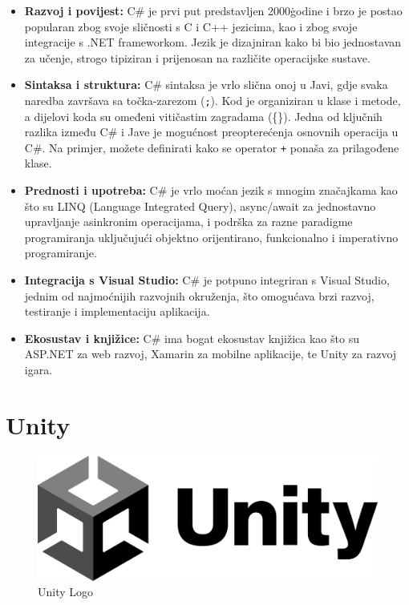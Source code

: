 \documentclass[diplomskirad]{fer}
\begin{document}
    \begin{itemize}
        \item \textbf{Razvoj i povijest:} C\# je prvi put predstavljen 2000\. godine i brzo je postao popularan zbog svoje sličnosti s C i C++ jezicima,
        kao i zbog svoje integracije s .NET frameworkom.
        Jezik je dizajniran kako bi bio jednostavan za učenje, strogo tipiziran i prijenosan na različite operacijske sustave.
        \item \textbf{Sintaksa i struktura:} C\# sintaksa je vrlo slična onoj u Javi, gdje svaka naredba završava sa točka-zarezom (\texttt{;}).
        Kod je organiziran u klase i metode, a dijelovi koda su omeđeni vitičastim zagradama (\{\}).
        Jedna od ključnih razlika između C\# i Jave je mogućnost preopterećenja osnovnih operacija u C\#.
        Na primjer, možete definirati kako se operator \texttt{+} ponaša za prilagođene klase.
        \item \textbf{Prednosti i upotreba:} C\# je vrlo moćan jezik s mnogim značajkama kao što su LINQ (Language Integrated Query),
        async/await za jednostavno upravljanje asinkronim operacijama, i podrška za razne paradigme programiranja uključujući objektno orijentirano,
        funkcionalno i imperativno programiranje.
        \item \textbf{Integracija s Visual Studio:} C\# je potpuno integriran s Visual Studio, jednim od najmoćnijih razvojnih okruženja, što omogućava brzi razvoj, testiranje i implementaciju aplikacija.
        \item \textbf{Ekosustav i knjižice:} C\# ima bogat ekosustav knjižica kao što su ASP.NET za web razvoj, Xamarin za mobilne aplikacije, te Unity za razvoj igara.
    \end{itemize}


    \newpage


    \section{Unity}\label{sec:unity}

    \begin{figure}[H]
        \centering
        \includegraphics[scale=0.3]{images/unityLogo}
        \caption{
            Unity Logo \cite{unityLogo}
        }
        \label{fig:unityLogo}
    \end{figure}
\end{document}

